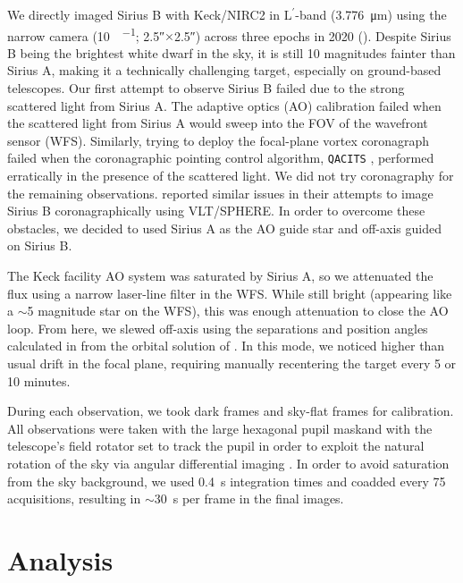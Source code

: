 \documentclass[twocolumn]{aastex631}
\newcommand\Lp{$\mathrm{L}^\prime$}
\begin{document}
We directly imaged Sirius B with Keck/NIRC2 in \Lp-band (\qty{3.776}{\micro\meter}) using the narrow camera (\qty{10}{\milliarcsecond\per\pixel}; \ang{;;2.5}$\times$\ang{;;2.5}) across three epochs in 2020 (). Despite Sirius B being the brightest white dwarf in the sky, it is still 10 magnitudes fainter than Sirius A, making it a technically challenging target, especially on ground-based telescopes. Our first attempt to observe Sirius B failed due to the strong scattered light from Sirius A. The adaptive optics (AO) calibration failed when the scattered light from Sirius A would sweep into the FOV of the wavefront sensor (WFS). Similarly, trying to deploy the focal-plane vortex coronagraph \citep{serabynKeckObservatoryInfrared2017} failed when the coronagraphic pointing control algorithm, \texttt{QACITS} \citep{hubyOnskyPerformanceQACITS2017a}, performed erratically in the presence of the scattered light. We did not try coronagraphy for the remaining observations. \citet[\S2]{viganHighcontrastImagingSirius2015} reported similar issues in their attempts to image Sirius B coronagraphically using VLT/SPHERE. In order to overcome these obstacles, we decided to used Sirius A as the AO guide star and off-axis guided on Sirius B.

The Keck facility AO system \citep{wizinowichPerformanceKeckObservatory2000} was saturated by Sirius A, so we attenuated the flux using a narrow laser-line filter in the WFS. While still bright (appearing like a $\sim$5 magnitude star on the WFS), this was enough attenuation to close the AO loop. From here, we slewed off-axis using the separations and position angles calculated in  from the orbital solution of \citet{bondSiriusSystemIts2017}. In this mode, we noticed higher than usual drift in the focal plane, requiring manually recentering the target every 5 or 10 minutes.

During each observation, we took dark frames and sky-flat frames for calibration. All observations were taken with the large hexagonal pupil maskand with the telescope's field rotator set to track the pupil in order to exploit the natural rotation of the sky via angular differential imaging \citep[ADI;][]{maroisAngularDifferentialImaging2006}. In order to avoid saturation from the sky background, we used \qty{0.4}{\second} integration times and coadded every \num{75} acquisitions, resulting in $\sim$\qty{30}{\second} per frame in the final images.

\section{Analysis} \label{sec:analysis}
\end{document}
